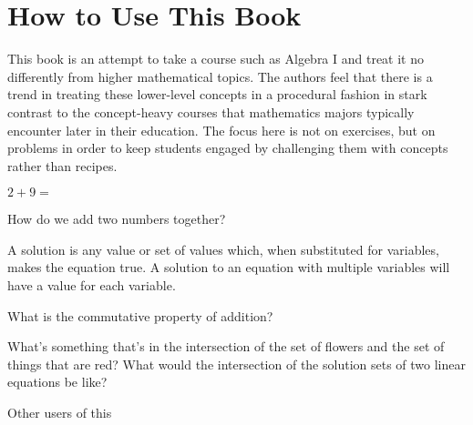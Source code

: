 \chapter{How to Use This Book}

This book is an attempt to take a course such as Algebra I and treat it no differently from higher mathematical topics.  The authors feel that there is a trend in treating these lower-level concepts in a procedural fashion in stark contrast to the concept-heavy courses that mathematics majors typically encounter later in their education.  The focus here is not on exercises, but on problems in order to keep students engaged by challenging them with concepts rather than recipes.

\begin{exercise}
$2 + 9 = $
\end{exercise}

\begin{problem}
How do we add two numbers together?
\end{problem}

\begin{defn}[Solution]
A solution is any value or set of values which, when substituted for variables, makes the equation true.  A solution to an equation with multiple variables will have a value for each variable.
\end{defn}

\begin{recall}
What is the commutative property of addition?
\end{recall}

\begin{prblm}
What's something that's in the intersection of the set of flowers and the set of things that are red?
What would the intersection of the solution sets of two linear equations be like?
\end{prblm}

Other users of this 